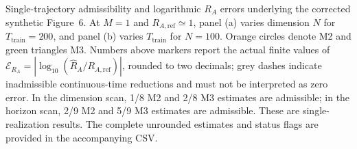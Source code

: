 \caption{Single-trajectory admissibility and logarithmic $R_A$ errors underlying the corrected synthetic Figure~6. At $M=1$ and $R_{A,\mathrm{ref}}\simeq1$, panel (a) varies dimension $N$ for $T_{\mathrm{train}}=200$, and panel (b) varies $T_{\mathrm{train}}$ for $N=100$. Orange circles denote M2 and green triangles M3. Numbers above markers report the actual finite values of $\mathcal E_{R_A}=|\log_{10}(\widehat R_A/R_{A,\mathrm{ref}})|$, rounded to two decimals; grey dashes indicate inadmissible continuous-time reductions and must not be interpreted as zero error. In the dimension scan, 1/8 M2 and 2/8 M3 estimates are admissible; in the horizon scan, 2/9 M2 and 5/9 M3 estimates are admissible. These are single-realization results. The complete unrounded estimates and status flags are provided in the accompanying CSV.}
